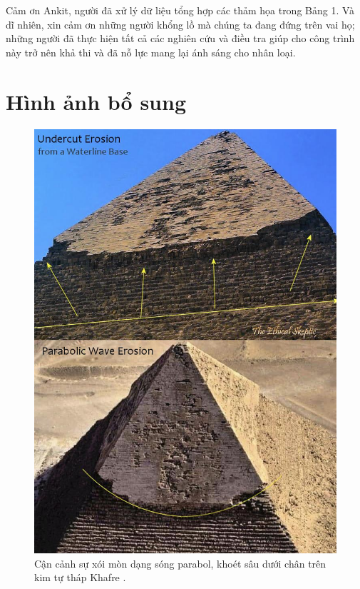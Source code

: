 \documentclass[10pt,twocolumn,letterpaper]{article}
\begin{document}
Cảm ơn Ankit, người đã xử lý dữ liệu tổng hợp các thảm họa trong Bảng 1.
Và dĩ nhiên, xin cảm ơn những người khổng lồ mà chúng ta đang đứng trên vai họ; những người đã thực hiện tất cả các nghiên cứu và điều tra giúp cho công trình này trở nên khả thi và đã nỗ lực mang lại ánh sáng cho nhân loại.

\clearpage
\twocolumn

\section{Hình ảnh bổ sung}


\begin{figure}[H]
\begin{center}
   \includegraphics[width=1\linewidth]{wave.jpg}
\end{center}
   \caption{Cận cảnh sự xói mòn dạng sóng parabol, khoét sâu dưới chân trên kim tự tháp Khafre \cite{27}.}
\label{fig:19}
\label{fig:onecol}
\end{figure}
\end{document}
